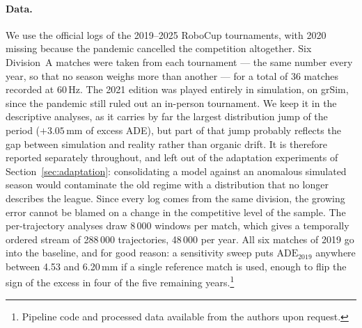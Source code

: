 \documentclass[runningheads]{llncs}
\begin{document}
\paragraph{Data.}
We use the official logs of the 2019--2025 RoboCup tournaments, with 2020
missing because the pandemic cancelled the competition altogether. Six
Division~A matches were taken from each tournament --- the same number every
year, so that no season weighs more than another --- for a total of 36 matches
recorded at 60\,Hz. The 2021 edition was played entirely in simulation, on
grSim, since the pandemic still ruled out an in-person tournament. We keep it in
the descriptive analyses, as it carries by far the largest distribution jump of
the period ($+3.05$\,mm of excess ADE), but part of that jump probably reflects
the gap between simulation and reality rather than organic drift. It is
therefore reported separately throughout, and left out of the adaptation
experiments of Section~\ref{sec:adaptation}: consolidating a model against an
anomalous simulated season would contaminate the old regime with a distribution
that no longer describes the league. Since every log comes from the same
division, the growing error cannot be blamed on a change in the competitive
level of the sample. The per-trajectory analyses draw 8\,000 windows per match,
which gives a temporally ordered stream of 288\,000 trajectories, 48\,000 per
year. All six matches of 2019 go into the baseline, and for good reason: a
sensitivity sweep puts $\mathrm{ADE}_{2019}$ anywhere between 4.53 and
6.20\,mm if a single reference match is used, enough to flip the sign of the
excess in four of the five remaining years.\footnote{Pipeline code and
processed data available from the authors upon request.}
\end{document}
